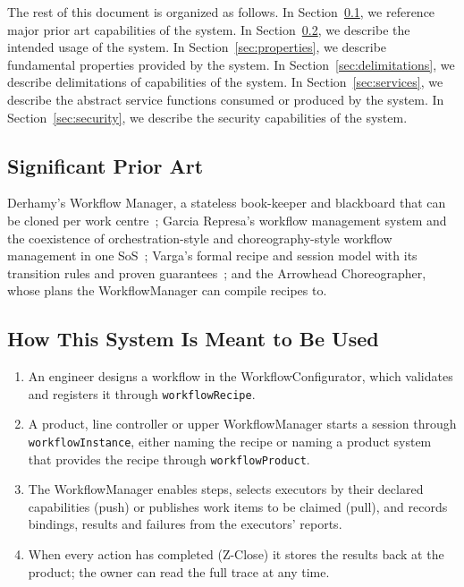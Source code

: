\documentclass[a4paper]{arrowhead}
\begin{document}
The rest of this document is organized as follows.
In Section~\ref{sec:prior_art}, we reference major prior art capabilities of the system.
In Section~\ref{sec:use}, we describe the intended usage of the system.
In Section~\ref{sec:properties}, we describe fundamental properties provided by the system.
In Section~\ref{sec:delimitations}, we describe delimitations of capabilities of the system.
In Section~\ref{sec:services}, we describe the abstract service functions consumed or produced by the system.
In Section~\ref{sec:security}, we describe the security capabilities of the system.

\newpage
\subsection{Significant Prior Art}
\label{sec:prior_art}
Derhamy's Workflow Manager, a stateless book-keeper and blackboard that can be cloned per work
centre~\cite{derhamy2018,derhamy2018workflow}; Garcia Represa's workflow management system and the coexistence of
orchestration-style and choreography-style workflow management in one SoS~\cite{represa2022}; Varga's formal recipe
and session model with its transition rules and proven guarantees~\cite{varga2026}; and the Arrowhead Choreographer,
whose plans the WorkflowManager can compile recipes to.

\subsection{How This System Is Meant to Be Used}
\label{sec:use}
\begin{enumerate}
\item An engineer designs a workflow in the WorkflowConfigurator, which validates and registers it through
\texttt{workflow\allowbreak{}Recipe}.
\item A product, line controller or upper WorkflowManager starts a session through \texttt{workflow\allowbreak{}Instance}, either
naming the recipe or naming a product system that provides the recipe through \texttt{workflow\allowbreak{}Product}.
\item The WorkflowManager enables steps, selects executors by their declared capabilities (push) or publishes work
items to be claimed (pull), and records bindings, results and failures from the executors' reports.
\item When every action has completed (Z-Close) it stores the results back at the product; the owner can read the full
trace at any time.
\end{enumerate}
\end{document}
